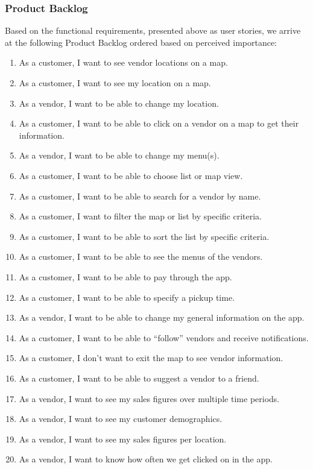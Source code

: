 \subsubsection{Product Backlog}
Based on the functional requirements, presented above as user stories, we arrive at the following Product Backlog ordered based on perceived importance:
\begin{enumerate}
  \item As a customer, I want to see vendor locations on a map.
  \item As a customer, I want to see my location on a map.
  \item As a vendor, I want to be able to change my location.
  \item As a customer, I want to be able to click on a vendor on a map to get their information.
  \item As a vendor, I want to be able to change my menu(s).
  \item As a customer, I want to be able to choose list or map view.
  \item As a customer, I want to be able to search for a vendor by name.
  \item As a customer, I want to filter the map or list by specific criteria.
  \item As a customer, I want to be able to sort the list by specific criteria.
  \item As a customer, I want to be able to see the menus of the vendors.
  \item As a customer, I want to be able to pay through the app.
  \item As a customer, I want to be able to specify a pickup time.
  \item As a vendor, I want to be able to change my general information on the app.
  \item As a customer, I want to be able to “follow” vendors and receive notifications.
  \item As a customer, I don’t want to exit the map to see vendor information.
  \item As a customer, I want to be able to suggest a vendor to a friend.
  \item As a vendor, I want to see my sales figures over multiple time periods.
  \item As a vendor, I want to see my customer demographics.
  \item As a vendor, I want to see my sales figures per location.
  \item As a vendor, I want to know how often we get clicked on in the app.
\end{enumerate}
